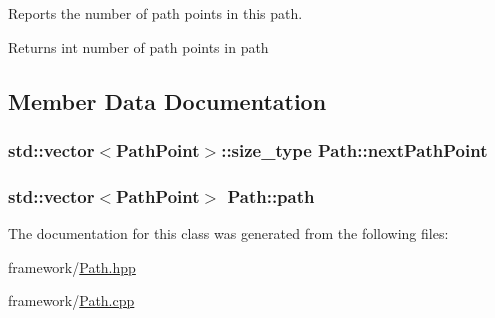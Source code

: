 Reports the number of path points in this path. 

\begin{DoxyReturn}{Returns}
int number of path points in path 
\end{DoxyReturn}


\subsection{Member Data Documentation}
\hypertarget{classPath_a29c205bd85a584663cdb5b4e61d6a871}{
\subsubsection[{next\-Path\-Point}]{\setlength{\rightskip}{0pt plus 5cm}std\-::vector$<${\bf Path\-Point}$>$\-::size\-\_\-type Path\-::next\-Path\-Point\hspace{0.3cm}{\ttfamily [private]}}}\label{classPath_a29c205bd85a584663cdb5b4e61d6a871}
\hypertarget{classPath_a48208f93e5010f15f33f487c4fc63b00}{
\subsubsection[{path}]{\setlength{\rightskip}{0pt plus 5cm}std\-::vector$<${\bf Path\-Point}$>$ Path\-::path\hspace{0.3cm}{\ttfamily [private]}}}\label{classPath_a48208f93e5010f15f33f487c4fc63b00}


The documentation for this class was generated from the following files\-:\begin{DoxyCompactItemize}
\item 
framework/\hyperlink{Path_8hpp}{Path.\-hpp}\item 
framework/\hyperlink{Path_8cpp}{Path.\-cpp}\end{DoxyCompactItemize}
